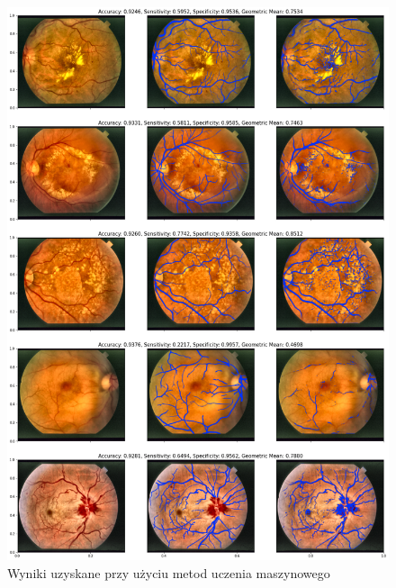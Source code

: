 \documentclass[11pt]{article}
\begin{document}
\begin{figure}[h]
    \centering
	\includegraphics[scale=0.4]{res/oko-2.png}
	\caption{Wyniki uzyskane przy użyciu metod uczenia maszynowego}
	\label{fig:demo}
\end{figure}
\end{document}
